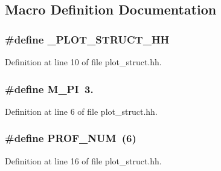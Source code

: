 \subsection{Macro Definition Documentation}
\hypertarget{plot__struct_8hh_afe4893d33e9cf48f7d08ced2701141a8}{
\subsubsection[{\+\_\+\+P\+L\+O\+T\+\_\+\+S\+T\+R\+U\+C\+T\+\_\+\+H\+H}]{\setlength{\rightskip}{0pt plus 5cm}\#define \+\_\+\+P\+L\+O\+T\+\_\+\+S\+T\+R\+U\+C\+T\+\_\+\+H\+H}}\label{plot__struct_8hh_afe4893d33e9cf48f7d08ced2701141a8}


Definition at line 10 of file plot\+\_\+struct.\+hh.

\hypertarget{plot__struct_8hh_ae71449b1cc6e6250b91f539153a7a0d3}{
\subsubsection[{M\+\_\+\+P\+I}]{\setlength{\rightskip}{0pt plus 5cm}\#define M\+\_\+\+P\+I~3.}}\label{plot__struct_8hh_ae71449b1cc6e6250b91f539153a7a0d3}


Definition at line 6 of file plot\+\_\+struct.\+hh.

\hypertarget{plot__struct_8hh_a2157e7b8a768152a4baebc430cdbe941}{
\subsubsection[{P\+R\+O\+F\+\_\+\+N\+U\+M}]{\setlength{\rightskip}{0pt plus 5cm}\#define P\+R\+O\+F\+\_\+\+N\+U\+M~(6)}}\label{plot__struct_8hh_a2157e7b8a768152a4baebc430cdbe941}


Definition at line 16 of file plot\+\_\+struct.\+hh.

